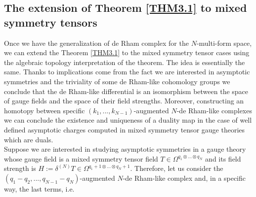 \documentclass[a4paper,12pt]{article}
\begin{document}
\subsection{The extension of Theorem \ref{THM3.1} to mixed symmetry tensors}\label{exthm}
Once we have the generalization of de Rham complex for the $N$-multi-form space, we can extend the Theorem \ref{THM3.1} to the mixed symmetry tensor cases using the algebraic topology interpretation of the theorem. The idea is essentially the same. Thanks to implications come from the fact we are interested in asymptotic symmetries and the triviality of some de Rham-like cohomology groups we conclude that the de Rham-like differential is an isomorphism between the space of gauge fields and the space of their field strengths. Moreover, constructing an homotopy between specific $(k_1,...,k_{N-1})$-augmented $N$-de Rham-like complexes we can conclude the existence and uniqueness of a duality map in the case of well defined asymptotic charges computed in mixed symmetry tensor gauge theories which are duals.\\
Suppose we are interested in studying asymptotic symmetries in a gauge theory whose gauge field is a mixed symmetry tensor field $T \in \Omega^{q_1 \otimes ... \otimes q_N}$ and its field strength is $H:=\delta^{(N)}T \in \Omega^{q_1+1 \otimes ... \otimes q_N+1}$. Therefore, let us consider the $(q_1-q_2,...,q_{N-1}-q_N)$-augmented $N$-de Rham-like complex and, in a specific way, the last terms, i.e.
\end{document}
